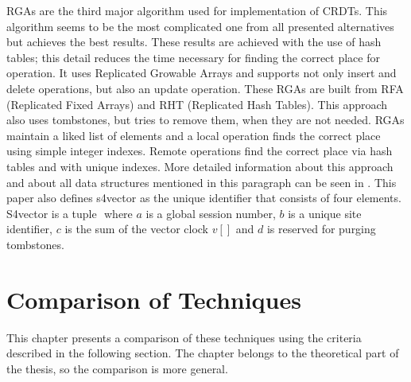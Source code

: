 \documentclass[12pt,oneside]{fithesis2}
\begin{document}
\par RGAs are the third major algorithm used for implementation of CRDTs. This algorithm seems to be the most complicated one from all presented alternatives but achieves the best results. These results are achieved with the use of hash tables; this detail reduces the time necessary for finding the correct place for operation.  It uses Replicated Growable Arrays and supports not only insert and delete operations, but also an update operation. These RGAs are built from RFA (Replicated Fixed Arrays) and RHT (Replicated Hash Tables). This approach also uses tombstones, but tries to remove them, when they are not needed. RGAs maintain a liked list of elements and a local operation finds the correct place using simple integer indexes. Remote operations find the correct place via hash tables and with unique indexes. More detailed information about this approach and about all data structures mentioned in this paragraph can be seen in \cite{RGA}. This paper also defines s4vector as the unique identifier that consists of four elements. S4vector is a tuple \(<a,b,c,d>\) where \(a\) is a global session number, \(b\) is a unique site identifier, \(c\) is the sum of the vector clock \(v[]\) and \(d\) is reserved for purging tombstones. 
\chapter{Comparison of Techniques}
This chapter presents a comparison of these techniques using the criteria described in the following section. The chapter belongs to the theoretical part of the thesis, so the comparison is more general. 
\end{document}
